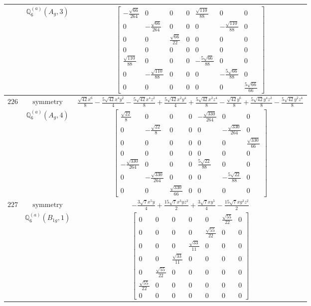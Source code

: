\documentclass[fleqn,8pt,landscape]{jsarticle}
\begin{document}
\begin{longtable}{ccc}
$  $ & $ \mathbb{Q}_{6}^{(a)}(A_{g},3) $ & $ \begin{bmatrix} - \frac{\sqrt{66}}{264} & 0 & 0 & 0 & \frac{\sqrt{110}}{88} & 0 & 0 \\ 0 & - \frac{\sqrt{66}}{264} & 0 & 0 & 0 & - \frac{\sqrt{110}}{88} & 0 \\ 0 & 0 & \frac{\sqrt{66}}{22} & 0 & 0 & 0 & 0 \\ 0 & 0 & 0 & 0 & 0 & 0 & 0 \\ \frac{\sqrt{110}}{88} & 0 & 0 & 0 & - \frac{5 \sqrt{66}}{88} & 0 & 0 \\ 0 & - \frac{\sqrt{110}}{88} & 0 & 0 & 0 & - \frac{5 \sqrt{66}}{88} & 0 \\ 0 & 0 & 0 & 0 & 0 & 0 & \frac{5 \sqrt{66}}{66} \end{bmatrix} $ \\ \hline
$ 226 $ & $ \text{symmetry} $ & $ \frac{\sqrt{42} x^{6}}{8} - \frac{5 \sqrt{42} x^{4} y^{2}}{4} - \frac{5 \sqrt{42} x^{4} z^{2}}{8} + \frac{5 \sqrt{42} x^{2} y^{4}}{4} + \frac{5 \sqrt{42} x^{2} z^{4}}{8} - \frac{\sqrt{42} y^{6}}{8} + \frac{5 \sqrt{42} y^{4} z^{2}}{8} - \frac{5 \sqrt{42} y^{2} z^{4}}{8} $ \\
$  $ & $ \mathbb{Q}_{6}^{(a)}(A_{g},4) $ & $ \begin{bmatrix} \frac{\sqrt{22}}{8} & 0 & 0 & 0 & - \frac{\sqrt{330}}{264} & 0 & 0 \\ 0 & - \frac{\sqrt{22}}{8} & 0 & 0 & 0 & - \frac{\sqrt{330}}{264} & 0 \\ 0 & 0 & 0 & 0 & 0 & 0 & \frac{\sqrt{330}}{66} \\ 0 & 0 & 0 & 0 & 0 & 0 & 0 \\ - \frac{\sqrt{330}}{264} & 0 & 0 & 0 & \frac{5 \sqrt{22}}{88} & 0 & 0 \\ 0 & - \frac{\sqrt{330}}{264} & 0 & 0 & 0 & - \frac{5 \sqrt{22}}{88} & 0 \\ 0 & 0 & \frac{\sqrt{330}}{66} & 0 & 0 & 0 & 0 \end{bmatrix} $ \\ \hline
$ 227 $ & $ \text{symmetry} $ & $ - \frac{3 \sqrt{7} x^{5} y}{4} + \frac{15 \sqrt{7} x^{3} y z^{2}}{2} + \frac{3 \sqrt{7} x y^{5}}{4} - \frac{15 \sqrt{7} x y^{3} z^{2}}{2} $ \\
$  $ & $ \mathbb{Q}_{6}^{(a)}(B_{1g},1) $ & $ \begin{bmatrix} 0 & 0 & 0 & 0 & 0 & \frac{\sqrt{55}}{22} & 0 \\ 0 & 0 & 0 & 0 & \frac{\sqrt{55}}{22} & 0 & 0 \\ 0 & 0 & 0 & \frac{\sqrt{33}}{11} & 0 & 0 & 0 \\ 0 & 0 & \frac{\sqrt{33}}{11} & 0 & 0 & 0 & 0 \\ 0 & \frac{\sqrt{55}}{22} & 0 & 0 & 0 & 0 & 0 \\ \frac{\sqrt{55}}{22} & 0 & 0 & 0 & 0 & 0 & 0 \\ 0 & 0 & 0 & 0 & 0 & 0 & 0 \end{bmatrix} $ \\ \hline

\end{longtable}
\end{document}
